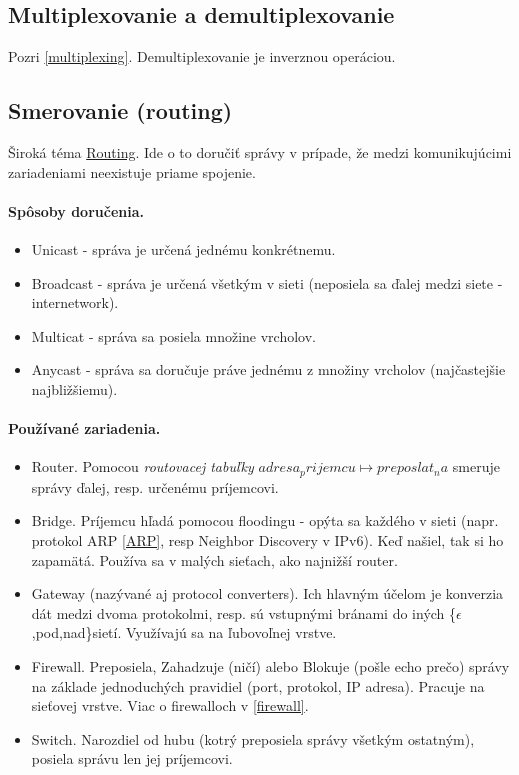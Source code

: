 \documentclass[10pt,a4paper]{article}
\begin{document}
\subsection{Multiplexovanie a demultiplexovanie}  
Pozri \ref{multiplexing}. Demultiplexovanie je inverznou operáciou. 

\subsection{Smerovanie (routing)}     
\label{routing}
Široká téma \href{http://en.wikipedia.org/wiki/Routing}{Routing}. 
Ide o to doručiť správy v prípade, že medzi komunikujúcimi zariadeniami neexistuje priame spojenie. 

\paragraph{Spôsoby doručenia.}
\begin{itemize}
\item Unicast - správa je určená jednému konkrétnemu.         
\item Broadcast - správa je určená všetkým v sieti (neposiela sa ďalej medzi siete - internetwork).
\item Multicat - správa sa posiela množine vrcholov. 
\item Anycast - správa sa doručuje práve jednému z množiny vrcholov (najčastejšie najbližšiemu).
\end{itemize}                               
                
\paragraph{Používané zariadenia.}
\begin{itemize}
\item Router. Pomocou \emph{routovacej tabuľky} $adresa_prijemcu \mapsto preposlat_na$ smeruje správy ďalej, resp. určenému príjemcovi.         
\item Bridge. Príjemcu hľadá pomocou floodingu - opýta sa každého v sieti (napr. protokol ARP \ref{ARP}, resp Neighbor Discovery v IPv6). Keď našiel, tak si ho zapamätá. Používa sa v malých sieťach, ako najnižší router.  
\item Gateway (nazývané aj protocol converters). Ich hlavným účelom je konverzia dát medzi dvoma protokolmi, resp. sú vstupnými bránami do iných \{$\epsilon$,pod,nad\}sietí. Využívajú sa na ľubovoľnej vrstve. 
\item Firewall. Preposiela, Zahadzuje (ničí) alebo Blokuje (pošle echo prečo) správy na základe jednoduchých pravidiel (port, protokol, IP adresa). Pracuje na sieťovej vrstve. Viac o firewalloch v \ref{firewall}. 
\item Switch. Narozdiel od hubu (kotrý preposiela správy všetkým ostatným), posiela správu len jej príjemcovi. 
\end{itemize}  
\end{document}
